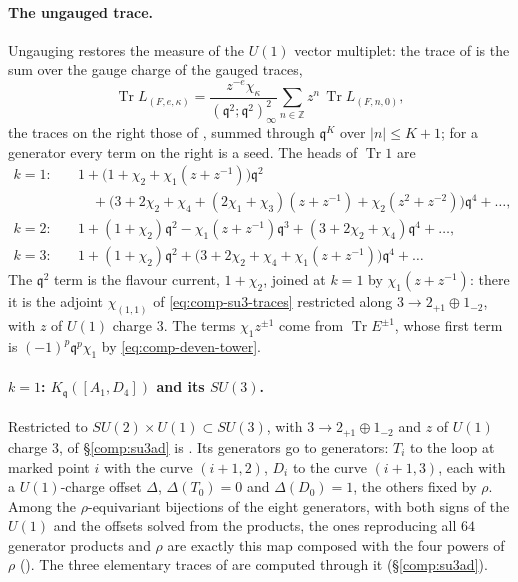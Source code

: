 \documentclass[11pt]{amsart}
\DeclareMathOperator{\Tr}{Tr}
\newcommand\fq{\mathfrak{q}}
\newcommand\bZ{\mathbb{Z}}
\theoremstyle{remark}
\begin{document}
\paragraph{The ungauged trace.}  Ungauging restores the measure of the
$U(1)$ vector multiplet: the trace of  is the sum over
the gauge charge of the gauged traces,
\begin{equation}\label{eq:comp-deven-ungauge}
  \Tr L_{(F,e,\kappa)}=\frac{z^{-e}\chi_\kappa}{(\fq^2;\fq^2)^2_\infty}\sum_{n\in\bZ}z^n\,\Tr L_{(F,n,0)},
\end{equation}
the traces on the right those of , summed
through $\fq^K$ over $|n|\le K+1$; for a generator every term on the right is
a seed.  The heads of $\Tr1$ are
\begin{equation}\label{eq:comp-deven-heads}
\begin{aligned}
  k=1\!:&\quad 1+\bigl(1+\chi_2+\chi_1(z+z^{-1})\bigr)\fq^2\\
   &\qquad+\bigl(3+2\chi_2+\chi_4+(2\chi_1+\chi_3)(z+z^{-1})+\chi_2(z^2+z^{-2})\bigr)\fq^4+\dots,\\
  k=2\!:&\quad 1+(1+\chi_2)\fq^2-\chi_1(z+z^{-1})\fq^3+(3+2\chi_2+\chi_4)\fq^4+\dots,\\
  k=3\!:&\quad 1+(1+\chi_2)\fq^2+\bigl(3+2\chi_2+\chi_4+\chi_1(z+z^{-1})\bigr)\fq^4+\dots
\end{aligned}
\end{equation}
The $\fq^2$ term is the flavour current, $1+\chi_2$, joined at $k=1$ by
$\chi_1(z+z^{-1})$: there it is the adjoint $\chi_{(1,1)}$ of
\eqref{eq:comp-su3-traces} restricted along $3\to2_{+1}\oplus1_{-2}$, with $z$
of $U(1)$ charge $3$.  The terms $\chi_1z^{\pm1}$ come from $\Tr E^{\pm1}$,
whose first term is $(-1)^p\fq^p\chi_1$ by \eqref{eq:comp-deven-tower}.

\paragraph{$k=1$: $K_\fq([A_1,D_4])$ and its $SU(3)$.}  Restricted to
$SU(2)\times U(1)\subset SU(3)$, with $3\to2_{+1}\oplus1_{-2}$ and $z$ of
$U(1)$ charge $3$,  of \S\ref{comp:su3ad} is
.  Its generators go to generators: $T_i$ to the loop at
marked point $i$ with the curve $(i+1,2)$, $D_i$ to the curve $(i+1,3)$, each
with a $U(1)$-charge offset $\Delta$, $\Delta(T_0)=0$ and $\Delta(D_0)=1$, the
others fixed by $\rho$.  Among the $\rho$-equivariant bijections of the eight
generators, with both signs of the $U(1)$ and the offsets solved from the
products, the ones reproducing all $64$ generator products and $\rho$ are
exactly this map composed with the four powers of $\rho$
().  The three elementary traces of
 are computed through it (\S\ref{comp:su3ad}).
\end{document}

